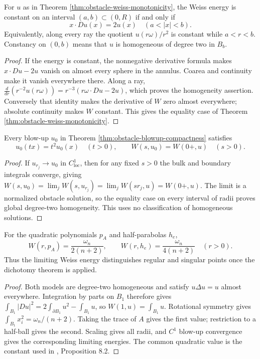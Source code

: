 \begin{corollary}\label{cor:obstacle-weiss-equality}
For $u$ as in Theorem \ref{thm:obstacle-weiss-monotonicity}, the Weiss energy is constant on an interval $(a,b)\subset(0,R)$ if and only if
\[
 x\cdot Du(x)=2u(x)\quad(a<|x|<b).
\]
Equivalently, along every ray the quotient $u(r\omega)/r^2$ is constant while $a<r<b$. Constancy on $(0,b)$ means that $u$ is homogeneous of degree two in $B_b$.
\end{corollary}
\begin{proof}
If the energy is constant, the nonnegative derivative formula makes $x\cdot Du-2u$ vanish on almost every sphere in the annulus. Coarea and continuity make it vanish everywhere there. Along a ray,
$\frac d{dr}(r^{-2}u(r\omega))=r^{-3}(r\omega\cdot Du-2u)$, which proves the homogeneity assertion. Conversely that identity makes the derivative of $W$ zero almost everywhere; absolute continuity makes $W$ constant. This gives the equality case of Theorem \ref{thm:obstacle-weiss-monotonicity}.
\end{proof}

\begin{proposition}\label{prop:obstacle-blowup-homogeneous}
Every blow-up $u_0$ in Theorem \ref{thm:obstacle-blowup-compactness} satisfies
\[
 u_0(tx)=t^2u_0(x)\quad(t>0),\qquad
 W(s,u_0)=W(0+,u)\quad(s>0).
\]
\end{proposition}
\begin{proof}
If $u_{r_j}\to u_0$ in $C^1_{\mathrm{loc}}$, then for any fixed $s>0$ the bulk and boundary integrals converge, giving
$W(s,u_0)=\lim_jW(s,u_{r_j})=\lim_jW(sr_j,u)=W(0+,u)$. The limit is a normalized obstacle solution, so the equality case on every interval of radii proves global degree-two homogeneity. This uses no classification of homogeneous solutions.
\end{proof}

\begin{proposition}\label{prop:obstacle-model-weiss}
For the quadratic polynomials $p_A$ and half-parabolas $h_e$,
\[
 W(r,p_A)=\frac{\omega_n}{2(n+2)},\qquad
 W(r,h_e)=\frac{\omega_n}{4(n+2)}
 \quad(r>0).
\]
Thus the limiting Weiss energy distinguishes regular and singular points once the dichotomy theorem is applied.
\end{proposition}
\begin{proof}
Both models are degree-two homogeneous and satisfy $u\Delta u=u$ almost everywhere. Integration by parts on $B_1$ therefore gives
$\int_{B_1}|Du|^2=2\int_{\partial B_1}u^2-\int_{B_1}u$, so $W(1,u)=\int_{B_1}u$. Rotational symmetry gives $\int_{B_1}x_i^2=\omega_n/(n+2)$. Taking the trace of $A$ gives the first value; restriction to a half-ball gives the second. Scaling gives all radii, and $C^1$ blow-up convergence gives the corresponding limiting energies. The common quadratic value is the constant used in \cite{Fig18}, Proposition 8.2.
\end{proof}

